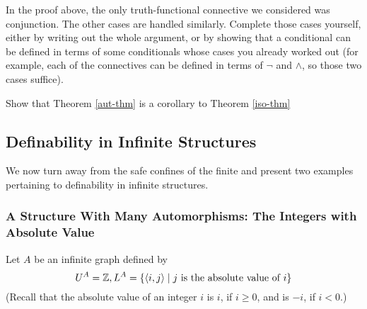 \begin{aside}
    In the proof above, the only truth-functional connective we considered was conjunction. The other cases are handled similarly. Complete those cases yourself, either by writing out the whole argument, or by showing that a conditional can be defined in terms of some conditionals whose cases you already worked out (for example, each of the connectives can be defined in terms of $\lnot$ and $\land$, so those two cases suffice). 
\end{aside}

\begin{aside}
    Show that Theorem \ref{aut-thm} is a corollary to Theorem \ref{iso-thm}
\end{aside}

\subsection*{Definability in Infinite Structures}
We now turn away from the safe confines of the finite and present two examples pertaining to definability in infinite structures.

\subsubsection*{A Structure With Many Automorphisms: The Integers with Absolute Value}
Let $A$ be an infinite graph defined by
\[
    U^A = \mathbb{Z}, L^A = \{\mbox{$\langle i,j \rangle$}\mid j \mbox{ is the absolute value of } i\}
\]
(Recall that the absolute value of an integer $i$ is $i$, if $i\geq 0$, and is $-i$, if $i< 0$.) 

